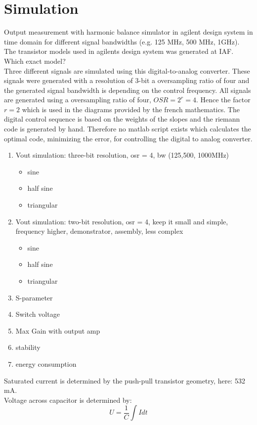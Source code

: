 \chapter{Simulation}
Output measurement with harmonic balance simulator in agilent design system in time domain for different signal bandwidths (e.g. 125 MHz, 500 MHz, 1GHz). The transistor models used in agilents design system was generated at IAF. Which exact model?\\
Three different signals are simulated using this digital-to-analog converter. These signals were generated with a resolution of 3-bit a oversampling ratio of four and the generated signal bandwidth is depending on the control frequency.
All signals are generated using a oversampling ratio of four, $OSR = 2^{r} = 4$. Hence the factor $r = 2$ which is used in the diagrams provided by the french mathematics. The digital control sequence is based on the weights of the slopes and the riemann code is generated by hand. Therefore no matlab script exists which calculates the optimal code, minimizing the error, for controlling the digital to analog converter. 
\begin{enumerate}
	\item Vout simulation: three-bit resolution, osr = 4, bw (125,500, 1000MHz)
	\begin{itemize}
		\item sine
		\item half sine
		\item triangular
	\end{itemize}
	\item Vout simulation: two-bit resolution, osr = 4, keep it small and simple, frequency higher, demonstrator, assembly, less complex
	\begin{itemize}
		\item sine
		\item half sine
		\item triangular
	\end{itemize}
	\item S-parameter		
	\item Switch voltage
	\item Max Gain with output amp
	\item stability
	\item energy consumption
\end{enumerate}

Saturated current is determined by the push-pull transistor geometry, here: 532 mA.\\Voltage across capacitor is determined by:
\begin{equation}
U = \frac{1}{C} \int I  dt 
\end{equation}

